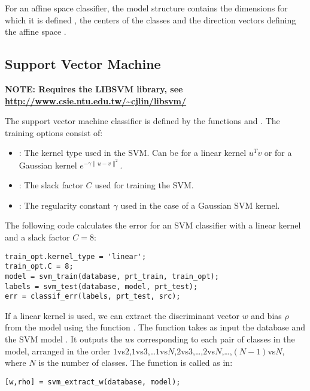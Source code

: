 \documentclass[twocolumn]{article}
\begin{document}
For an affine space classifier, the model structure contains the dimensions for which it is defined , the centers of the classes  and the direction vectors defining the affine space .

\subsection{Support Vector Machine}

\textbf{NOTE: Requires the LIBSVM library, see \url{http://www.csie.ntu.edu.tw/~cjlin/libsvm/}}

The support vector machine classifier is defined by the functions  and . The training options consist of:
\begin{itemize}
	\item {}: The kernel type used in the SVM. Can be  for a linear kernel $u^Tv$ or  for a Gaussian kernel $e^{-\gamma\|u-v\|^2}$.
	\item {}: The slack factor $C$ used for training the SVM.
	\item {}: The regularity constant $\gamma$ used in the case of a Gaussian SVM kernel.
\end{itemize}

The following code calculates the error for an SVM classifier with a linear kernel and a slack factor $C = 8$:
\begin{lstlisting}
train_opt.kernel_type = 'linear';
train_opt.C = 8;
model = svm_train(database, prt_train, train_opt);
labels = svm_test(database, model, prt_test);
err = classif_err(labels, prt_test, src);
\end{lstlisting}

If a linear kernel is used, we can extract the discriminant vector $w$ and bias $\rho$ from the model using the function . The function takes as input the database  and the SVM model . It outputs the $w$s corresponding to each pair of classes in the model, arranged in the order $1$vs$2$,$1$vs$3$,\ldots$1$vs$N$,$2$vs$3$,\ldots,$2$vs$N$,\ldots,$(N-1)$vs$N$, where $N$ is the number of classes. The function is called as in:
\begin{lstlisting}
[w,rho] = svm_extract_w(database, model);
\end{lstlisting}
\end{document}
